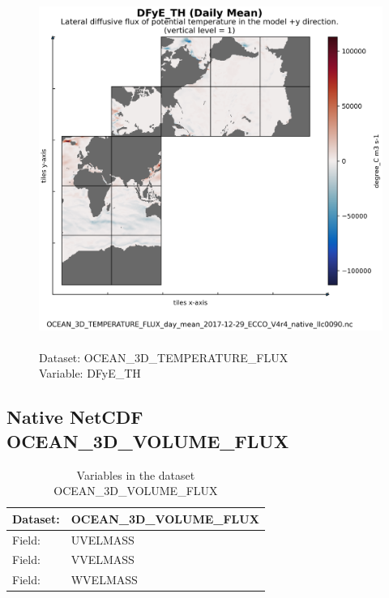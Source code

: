 \begin{figure}[H]
\centering
\includegraphics[scale=0.5]{../images/plots/native_plots/Ocean_Three-Dimensional_Potential_Temperature_Fluxes/DFyE_TH.png}
\caption{\\Dataset: OCEAN\_3D\_TEMPERATURE\_FLUX\\Variable: DFyE\_TH}
\label{tab:table-OCEAN_3D_TEMPERATURE_FLUX_DFyE_TH-Plot}
\end{figure}
\pagebreak
\subsection{Native NetCDF OCEAN\_3D\_VOLUME\_FLUX}
\newp
\begin{longtable}{|p{}|p{}|}
\caption{Variables in the dataset OCEAN\_3D\_VOLUME\_FLUX}
\label{tab:table-OCEAN_3D_VOLUME_FLUX-fields} \\ 
\hline \endhead \hline \endfoot
\rowcolor{lightgray} \textbf{Dataset:} & \textbf{OCEAN\_3D\_VOLUME\_FLUX} \\ \hline
Field: &UVELMASS \\ \hline
Field: &VVELMASS \\ \hline
Field: &WVELMASS \\ \hline
\end{longtable}

\pagebreak
